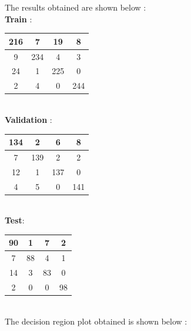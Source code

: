 \documentclass{article}
\begin{document}
\begin{flushleft}

The results obtained are shown below : \\[10pt]

\textbf{Train} : \\[10pt]
\begin{tabular}{|c|c|c|c|} \hline 216 & 7 & 19 & 8\\ \hline 9 & 234 & 4 & 3\\ \hline 24 & 1 & 225 & 0\\ \hline 2 & 4 & 0 & 244 \\ \hline \end{tabular} \\[10pt]


\textbf{Validation} : \\[10pt]

\begin{tabular}{|c|c|c|c|} \hline 134 & 2 & 6 & 8\\ \hline 7 & 139 & 2 & 2\\ \hline 12 & 1 & 137 & 0\\ \hline  4 & 5 & 0 & 141 \\ \hline \end{tabular} \\[10pt]




\textbf{Test}: \\[10pt]


\begin{tabular}{|c|c|c|c|} \hline 90 & 1 & 7 & 2\\ \hline 7 & 88 & 4 & 1\\ \hline 14 & 3 & 83 & 0\\ \hline 2 & 0 & 0 & 98  \\ \hline \end{tabular} \\[10pt]



The decision region plot obtained is shown below :

\end{flushleft}
\end{document}
